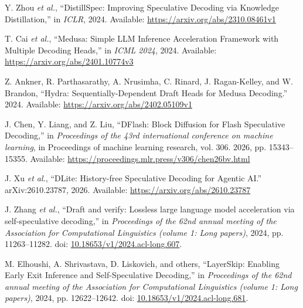 \documentclass[11pt,a4paper,UTF8,fontset=none,scheme=plain,zihao=-4]{ctexart}
\newenvironment{CSLReferences}[2]{%
  \footnotesize
  \raggedright
  \setlength{\leftskip}{3em}%
  \setlength{\parindent}{-3em}%
  \setlength{\parskip}{0.1\baselineskip}%
  \sloppy
}{}
\newcommand{\CSLLeftMargin}[1]{\makebox[3em][l]{#1}}
\newcommand{\CSLRightInline}[1]{#1}
\begin{document}
\begin{CSLReferences}{0}{0}
\leavevmode{}%
\CSLLeftMargin{{[}24{]} }
\CSLRightInline{Y. Zhou \emph{et al.}, {``{DistillSpec: Improving
Speculative Decoding via Knowledge Distillation},''} in \emph{ICLR},
2024. Available: \url{https://arxiv.org/abs/2310.08461v1}}

\leavevmode{}%
\CSLLeftMargin{{[}25{]} }
\CSLRightInline{T. Cai \emph{et al.}, {``{Medusa: Simple LLM Inference
Acceleration Framework with Multiple Decoding Heads},''} in \emph{ICML
2024}, 2024. Available: \url{https://arxiv.org/abs/2401.10774v3}}

\leavevmode{}%
\CSLLeftMargin{{[}26{]} }
\CSLRightInline{Z. Ankner, R. Parthasarathy, A. Nrusimha, C. Rinard, J.
Ragan-Kelley, and W. Brandon, {``{Hydra: Sequentially-Dependent Draft
Heads for Medusa Decoding}.''} 2024. Available:
\url{https://arxiv.org/abs/2402.05109v1}}

\leavevmode{}%
\CSLLeftMargin{{[}27{]} }
\CSLRightInline{J. Chen, Y. Liang, and Z. Liu, {``{DFlash: Block
Diffusion for Flash Speculative Decoding},''} in \emph{Proceedings of
the 43rd international conference on machine learning}, in Proceedings
of machine learning research, vol. 306. 2026, pp. 15343--15355.
Available: \url{https://proceedings.mlr.press/v306/chen26bv.html}}

\leavevmode{}%
\CSLLeftMargin{{[}28{]} }
\CSLRightInline{J. Xu \emph{et al.}, {``{DLite: History-free Speculative
Decoding for Agentic AI}.''} arXiv:2610.23787, 2026. Available:
\url{https://arxiv.org/abs/2610.23787}}

\leavevmode{}%
\CSLLeftMargin{{[}29{]} }
\CSLRightInline{J. Zhang \emph{et al.}, {``Draft and verify: Lossless
large language model acceleration via self-speculative decoding,''} in
\emph{Proceedings of the 62nd annual meeting of the {A}ssociation for
{C}omputational {L}inguistics (volume 1: Long papers)}, 2024, pp.
11263--11282. doi:
\href{https://doi.org/10.18653/v1/2024.acl-long.607}{10.18653/v1/2024.acl-long.607}.}

\leavevmode{}%
\CSLLeftMargin{{[}30{]} }
\CSLRightInline{M. Elhoushi, A. Shrivastava, D. Liskovich, and others,
{``{LayerSkip: Enabling Early Exit Inference and Self-Speculative
Decoding},''} in \emph{Proceedings of the 62nd annual meeting of the
{A}ssociation for {C}omputational {L}inguistics (volume 1: Long
papers)}, 2024, pp. 12622--12642. doi:
\href{https://doi.org/10.18653/v1/2024.acl-long.681}{10.18653/v1/2024.acl-long.681}.}


\end{CSLReferences}
\end{document}
